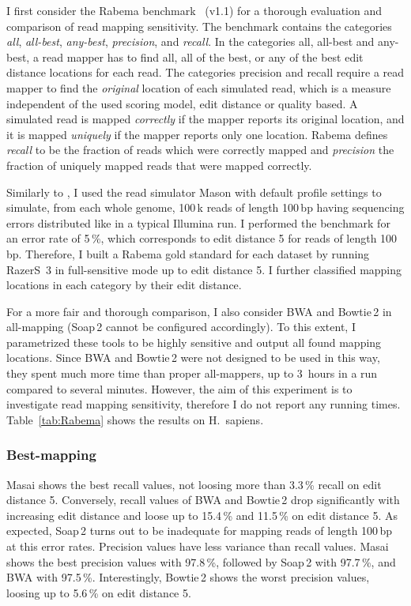 I first consider the Rabema benchmark~\citep{Holtgrewe2011} (v1.1) for a thorough evaluation and comparison of read mapping sensitivity.
The benchmark contains the categories \emph{all}, \emph{all-best}, \emph{any-best}, \emph{precision}, and \emph{recall}.
In the categories all, all-best and any-best, a read mapper has to find all, all of the best, or any of the best edit distance locations for each read.
The categories precision and recall require a read mapper to find the \emph{original} location of each simulated read, which is a measure independent of the used scoring model, \eg edit distance or quality based.
A simulated read is mapped \emph{correctly} if the mapper reports its original location, 
and it is mapped \emph{uniquely} if the mapper reports only one location.
Rabema defines \emph{recall} to be the fraction of reads which were correctly mapped and \emph{precision} the fraction of uniquely mapped reads that were mapped correctly.

Similarly to \citep{Langmead2012}, I used the read simulator Mason \citep{Holtgrewe2010} with default profile settings to simulate, from each whole genome, 100\,k reads of length 100\,bp having sequencing errors distributed like in a typical Illumina run.
I performed the benchmark for an error rate of 5\,\%, which corresponds to edit distance 5 for reads of length 100\,bp. Therefore, I built a Rabema gold standard for each dataset by running RazerS~3 in full-sensitive mode up to edit distance 5. I further classified mapping locations in each category by their edit distance.

For a more fair and thorough comparison, I also consider BWA and Bowtie\,2 in all-mapping (Soap\,2 cannot be configured accordingly).
To this extent, I parametrized these tools to be highly sensitive and output all found mapping locations.
Since BWA and Bowtie\,2 were not designed to be used in this way, they spent much more time than proper all-mappers, \ie up to 3~hours in a run compared to several minutes.
However, the aim of this experiment is to investigate read mapping sensitivity, therefore I do not report any running times.
Table~\ref{tab:Rabema} shows the results on H.~sapiens.

\subsubsection{Best-mapping}
Masai shows the best recall values, not loosing more than 3.3\,\% recall on edit distance 5.
Conversely, recall values of BWA and Bowtie\,2 drop significantly with increasing edit distance and loose up to 15.4\,\% and 11.5\,\% on edit distance 5.
As expected, Soap\,2 turns out to be inadequate for mapping reads of length 100\,bp at this error rates.
Precision values have less variance than recall values. Masai shows the best precision values with 97.8\,\%, followed by Soap\,2 with 97.7\,\%, and BWA with 97.5\,\%. Interestingly, Bowtie\,2 shows the worst precision values, loosing up to 5.6\,\% on edit distance 5.

